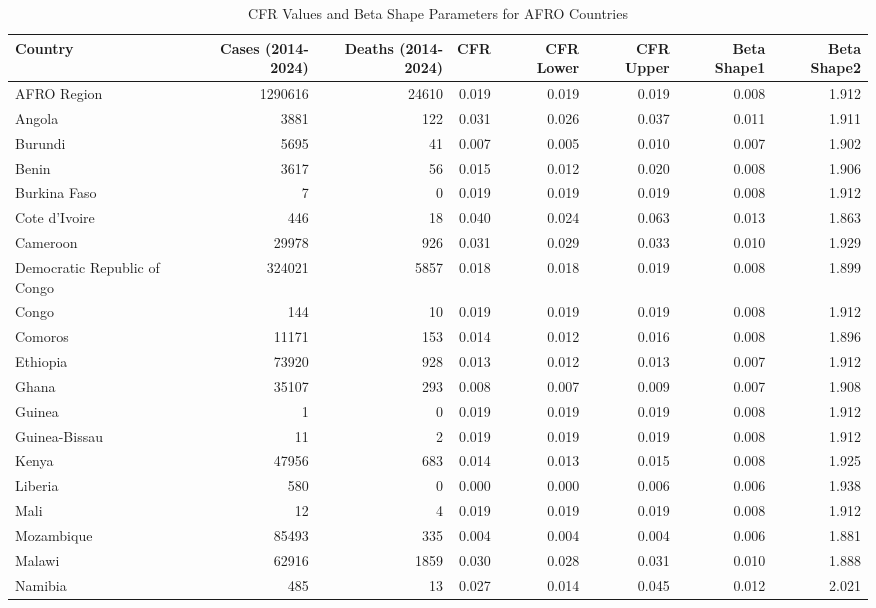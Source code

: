 \documentclass[
]{book}
\begin{document}
\begin{table}
\centering
\caption{\label{tab:cfr}CFR Values and Beta Shape Parameters for AFRO Countries}
\centering
\begin{tabular}[t]{l|r|r|r|r|r|r|r}
\hline
Country & Cases (2014-2024) & Deaths (2014-2024) & CFR & CFR Lower & CFR Upper & Beta Shape1 & Beta Shape2\\
\hline
AFRO Region & 1290616 & 24610 & 0.019 & 0.019 & 0.019 & 0.008 & 1.912\\
\hline
Angola & 3881 & 122 & 0.031 & 0.026 & 0.037 & 0.011 & 1.911\\
\hline
Burundi & 5695 & 41 & 0.007 & 0.005 & 0.010 & 0.007 & 1.902\\
\hline
Benin & 3617 & 56 & 0.015 & 0.012 & 0.020 & 0.008 & 1.906\\
\hline
Burkina Faso & 7 & 0 & 0.019 & 0.019 & 0.019 & 0.008 & 1.912\\
\hline
Cote d'Ivoire & 446 & 18 & 0.040 & 0.024 & 0.063 & 0.013 & 1.863\\
\hline
Cameroon & 29978 & 926 & 0.031 & 0.029 & 0.033 & 0.010 & 1.929\\
\hline
Democratic Republic of Congo & 324021 & 5857 & 0.018 & 0.018 & 0.019 & 0.008 & 1.899\\
\hline
Congo & 144 & 10 & 0.019 & 0.019 & 0.019 & 0.008 & 1.912\\
\hline
Comoros & 11171 & 153 & 0.014 & 0.012 & 0.016 & 0.008 & 1.896\\
\hline
Ethiopia & 73920 & 928 & 0.013 & 0.012 & 0.013 & 0.007 & 1.912\\
\hline
Ghana & 35107 & 293 & 0.008 & 0.007 & 0.009 & 0.007 & 1.908\\
\hline
Guinea & 1 & 0 & 0.019 & 0.019 & 0.019 & 0.008 & 1.912\\
\hline
Guinea-Bissau & 11 & 2 & 0.019 & 0.019 & 0.019 & 0.008 & 1.912\\
\hline
Kenya & 47956 & 683 & 0.014 & 0.013 & 0.015 & 0.008 & 1.925\\
\hline
Liberia & 580 & 0 & 0.000 & 0.000 & 0.006 & 0.006 & 1.938\\
\hline
Mali & 12 & 4 & 0.019 & 0.019 & 0.019 & 0.008 & 1.912\\
\hline
Mozambique & 85493 & 335 & 0.004 & 0.004 & 0.004 & 0.006 & 1.881\\
\hline
Malawi & 62916 & 1859 & 0.030 & 0.028 & 0.031 & 0.010 & 1.888\\
\hline
Namibia & 485 & 13 & 0.027 & 0.014 & 0.045 & 0.012 & 2.021\\

\end{tabular}
\end{table}
\end{document}
